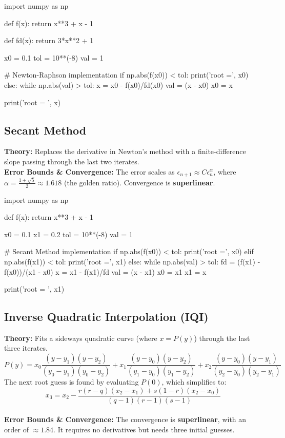 \documentclass{article}
\begin{document}
\begin{jupytercode}
import numpy as np

def f(x):
    return x**3 + x - 1
    
def fd(x):
    return 3*x**2 + 1

x0 = 0.1
tol = 10**(-8)
val = 1

# Newton-Raphson implementation
if np.abs(f(x0)) < tol:
    print('root =', x0)
else:
    while np.abs(val) > tol:
        x = x0 - f(x0)/fd(x0)
        val = (x - x0)
        x0 = x
        
    print('root = ', x)
\end{jupytercode}
\newpage

\subsection{Secant Method}
\textbf{Theory:} Replaces the derivative in Newton's method with a finite-difference slope passing through the last two iterates. \\
\textbf{Error Bounds \& Convergence:} The error scales as $\epsilon_{n+1} \approx C \epsilon_n^\alpha$, where $\alpha = \frac{1+\sqrt{5}}{2} \approx 1.618$ (the golden ratio). Convergence is \textbf{superlinear}.

\begin{jupytercode}
import numpy as np

def f(x):
    return x**3 + x - 1

x0 = 0.1
x1 = 0.2
tol = 10**(-8)
val = 1

# Secant Method implementation
if np.abs(f(x0)) < tol:
    print('root =', x0)
elif np.abs(f(x1)) < tol:
    print('root =', x1)
else:
    while np.abs(val) > tol:
        fd = (f(x1) - f(x0))/(x1 - x0)
        x = x1 - f(x1)/fd
        val = (x - x1)
        x0 = x1
        x1 = x

    print('root = ', x1)
\end{jupytercode}
\newpage

\subsection{Inverse Quadratic Interpolation (IQI)}
\textbf{Theory:} Fits a sideways quadratic curve (where $x = P(y)$) through the last three iterates. 
$$ P(y) = x_0 \frac{(y - y_1)(y - y_2)}{(y_0 - y_1)(y_0 - y_2)} + x_1 \frac{(y - y_0)(y - y_2)}{(y_1 - y_0)(y_1 - y_2)} + x_2 \frac{(y - y_0)(y - y_1)}{(y_2 - y_0)(y_2 - y_1)} $$
The next root guess is found by evaluating $P(0)$, which simplifies to:
$$ x_3 = x_2 - \frac{r(r - q)(x_2 - x_1) + s(1 - r)(x_2 - x_0)}{(q - 1)(r - 1)(s - 1)} $$ \\
\textbf{Error Bounds \& Convergence:} The convergence is \textbf{superlinear}, with an order of $\approx 1.84$. It requires no derivatives but needs three initial guesses.
\end{document}
